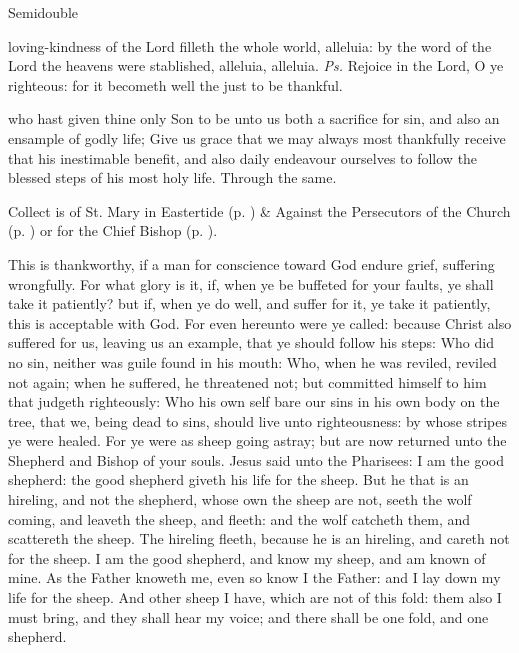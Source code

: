 \label{EasterII}
\begin{inhead}
    {Semidouble}
\end{inhead}

\properantiphonfix

\introit
{} loving-kindness of the Lord filleth the whole world, alleluia: by the word of the Lord the heavens were stablished, alleluia, alleluia. \textit{Ps.} Rejoice in the Lord, O ye righteous: for it becometh well the just to be thankful.

\collect\label{EasterIICollect}
 who hast given thine only Son to be unto us both a sacrifice for sin, and also an ensample of godly life; Give us grace that we may always most thankfully receive that his inestimable benefit, and also daily endeavour ourselves to follow the blessed steps of his most holy life. Through the same.
\begin{rubric}
     Collect is of St. Mary in Eastertide (p. \pageref{SPMaryInEaster}) \&  Against the Persecutors of the Church (p. \pageref{SPAgainst}) or for the Chief Bishop (p. \pageref{SPChiefBishop}).
\end{rubric}
 This is thankworthy, if a man for conscience toward God endure grief, suffering wrongfully. For what glory is it, if, when ye be buffeted for your faults, ye shall take it patiently? but if, when ye do well, and suffer for it, ye take it patiently, this is acceptable with God. For even hereunto were ye called: because Christ also suffered for us, leaving us an example, that ye should follow his steps: Who did no sin, neither was guile found in his mouth: Who, when he was reviled, reviled not again; when he suffered, he threatened not; but committed himself to him that judgeth righteously: Who his own self bare our sins in his own body on the tree, that we, being dead to sins, should live unto righteousness: by whose stripes ye were healed. For ye were as sheep going astray; but are now returned unto the Shepherd and Bishop of your souls.
 Jesus said unto the Pharisees: I am the good shepherd: the good shepherd giveth his life for the sheep. But he that is an hireling, and not the shepherd, whose own the sheep are not, seeth the wolf coming, and leaveth the sheep, and fleeth: and the wolf catcheth them, and scattereth the sheep. The hireling fleeth, because he is an hireling, and careth not for the sheep. I am the good shepherd, and know my sheep, and am known of mine. As the Father knoweth me, even so know I the Father: and I lay down my life for the sheep. And other sheep I have, which are not of this fold: them also I must bring, and they shall hear my voice; and there shall be one fold, and one shepherd.
